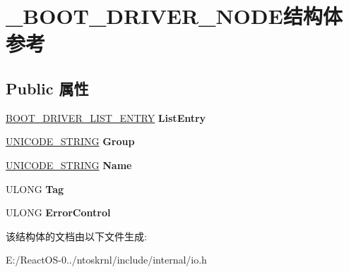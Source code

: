 \hypertarget{struct___b_o_o_t___d_r_i_v_e_r___n_o_d_e}{}\section{\+\_\+\+B\+O\+O\+T\+\_\+\+D\+R\+I\+V\+E\+R\+\_\+\+N\+O\+D\+E结构体 参考}
\label{struct___b_o_o_t___d_r_i_v_e_r___n_o_d_e}
\subsection*{Public 属性}
\begin{DoxyCompactItemize}
\item 
\mbox{\label{struct___b_o_o_t___d_r_i_v_e_r___n_o_d_e_ab11645ec04ba51f628447933732488e7}} 
\hyperlink{struct___b_o_o_t___d_r_i_v_e_r___l_i_s_t___e_n_t_r_y}{B\+O\+O\+T\+\_\+\+D\+R\+I\+V\+E\+R\+\_\+\+L\+I\+S\+T\+\_\+\+E\+N\+T\+RY} {\bfseries List\+Entry}
\item 
\mbox{\label{struct___b_o_o_t___d_r_i_v_e_r___n_o_d_e_a49a5fefb38f5e686deb98a1119a53f59}} 
\hyperlink{struct___u_n_i_c_o_d_e___s_t_r_i_n_g}{U\+N\+I\+C\+O\+D\+E\+\_\+\+S\+T\+R\+I\+NG} {\bfseries Group}
\item 
\mbox{\label{struct___b_o_o_t___d_r_i_v_e_r___n_o_d_e_af2f530283e55b1f9f5aa568efe7368e7}} 
\hyperlink{struct___u_n_i_c_o_d_e___s_t_r_i_n_g}{U\+N\+I\+C\+O\+D\+E\+\_\+\+S\+T\+R\+I\+NG} {\bfseries Name}
\item 
\mbox{\label{struct___b_o_o_t___d_r_i_v_e_r___n_o_d_e_a24c1cc9b806fbe7e59f2bf9cc57c8859}} 
U\+L\+O\+NG {\bfseries Tag}
\item 
\mbox{\label{struct___b_o_o_t___d_r_i_v_e_r___n_o_d_e_acc9aa3f2e4dd3c538131e0598b030c98}} 
U\+L\+O\+NG {\bfseries Error\+Control}
\end{DoxyCompactItemize}


该结构体的文档由以下文件生成\+:\begin{DoxyCompactItemize}
\item 
E\+:/\+React\+O\+S-\/0../ntoskrnl/include/internal/io.\+h\end{DoxyCompactItemize}
